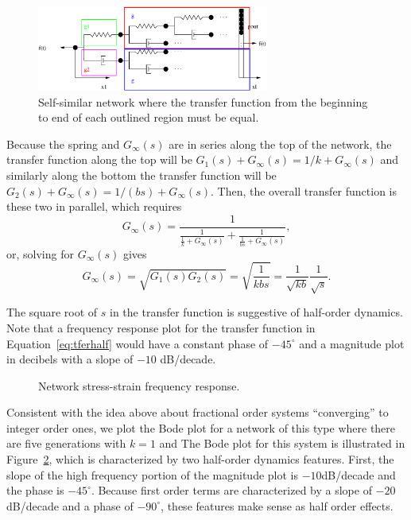 \begin{example}
\begin{figure}
  \centering
{}
  \includegraphics[width=3in]{figs/structure2}
  \caption{Self-similar network where the transfer function from the beginning to end of each outlined region must be equal.}
  \label{fig:selfsimilar}
\end{figure}

Because the spring and $G_\infty(s)$ are in series along the top of the network, the transfer function along the top will be $G_1(s) + G_\infty(s) = 1/k + G_\infty(s)$ and similarly along the bottom the transfer function will be $G_2(s) + G_\infty(s) = 1/(bs) + G_\infty(s)$. Then, the overall transfer function is these two in parallel, which requires
\begin{equation*}
  G_\infty(s) = \frac{1}{\frac{1}{\frac{1}{k} + G_\infty(s)} + \frac{1}{\frac{1}{bs} + G_\infty(s)}},
\end{equation*}
or, solving for $G_\infty(s)$ gives
\begin{equation}
  G_\infty(s) = \sqrt{G_1(s) G_2(s)} =\sqrt{\frac{1}{k b s }} = \frac{1}{\sqrt{kb}} \frac{1}{\sqrt{s}}.
  \label{eq:tferhalf}
\end{equation}

The square root of $s$ in the transfer function is suggestive of half-order dynamics. Note that a frequency response plot for the transfer function in Equation~\ref{eq:tferhalf} would have a constant phase of $-45^\circ$ and a magnitude plot in decibels with a slope of $-10$ dB/decade.

\begin{figure}
  \centering
  
  \caption{Network stress-strain frequency response.}
  \label{fig:bodeelement}
\end{figure}

Consistent with the idea above about fractional order systems ``converging'' to integer order ones, we plot the Bode plot for a network of this type where there are five generations with $k =1$ and The Bode plot for this system is illustrated in Figure~\ref{fig:bodeelement}, which is characterized by two half-order dynamics features. First, the slope of the high frequency portion of the magnitude plot is $-10$dB/decade and the phase is $-45^\circ$. Because first order terms are characterized by a slope of $-20$dB/decade and a phase of $-90^\circ$, these features make sense as half order effects.
\end{example}

